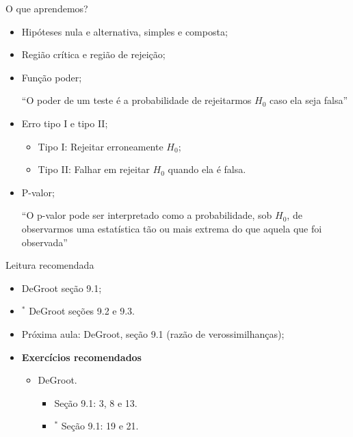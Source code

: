 \begin{frame}{O que aprendemos?}
\begin{itemize}

  \item[\faLightbulbO] Hipóteses nula e alternativa, simples e composta;    
  \item[\faLightbulbO] Região crítica e região de rejeição;
  \item[\faLightbulbO] Função poder;
  
  ``O poder de um teste é a probabilidade de rejeitarmos $H_0$ caso ela seja falsa''
  
  \item[\faLightbulbO] Erro tipo I e tipo II;
  \begin{itemize}
   \item Tipo I: Rejeitar erroneamente $H_0$;
   \item Tipo II: Falhar em rejeitar $H_0$ quando ela é falsa.
  \end{itemize}
  \item[\faLightbulbO] P-valor;
  
  ``O p-valor pode ser interpretado como a probabilidade, sob $H_0$, de observarmos uma estatística tão ou mais extrema do que aquela que foi observada''
  \end{itemize}
 \end{frame}

\begin{frame}{Leitura recomendada}
\begin{itemize}
 \item[\faBook] DeGroot seção 9.1;
 \item[\faBook] $^\ast$ DeGroot seções 9.2 e 9.3.
 \item[\faForward] Próxima aula: DeGroot, seção 9.1 (razão de verossimilhanças);
 \item {\large\textbf{Exercícios recomendados}}
 \begin{itemize}
  \item[\faBookmark] DeGroot.
  \begin{itemize}
   \item Seção 9.1: 3, 8 e 13.
   \item $^\ast$ Seção 9.1: 19 e 21.
  \end{itemize}   
  \end{itemize}
 \end{itemize} 
\end{frame}
